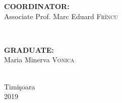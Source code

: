 \documentclass[12pt, a4paper]{report}
\begin{document}
\begin{titlepage}
		
		
		\begin{minipage}{0.4\textwidth}
			\begin{flushleft} \large
				\textbf{COORDINATOR:}\\
				Associate Prof. Marc Eduard \textsc{Frîncu} %
			\end{flushleft}
		\end{minipage}
		~
		\begin{minipage}{0.4\textwidth}
			\begin{flushright} \large
				\textbf{GRADUATE:} \\
				Maria Minerva \textsc{Vonica} %
			\end{flushright}
		\end{minipage}\\[0.5cm]
		
		
		\vfill
		{\large Timi\c{s}oara \\2019}\\ %
		
		
		
		
	\end{titlepage}
	
	
	
\end{document}
